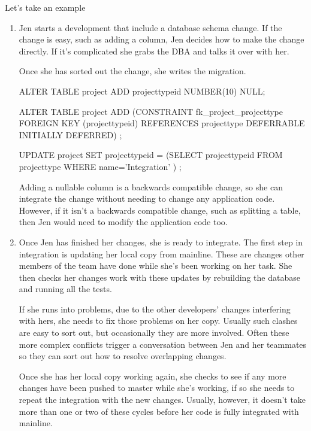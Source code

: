 \documentclass[12pt]{article}
\begin{document}
Let's take an example

\begin{enumerate}
  \item Jen starts a development that include a database schema change.
    If the change is easy, such as adding a column, Jen decides how to
    make the change directly. If it's complicated she grabs the DBA and
    talks it over with her.

    Once she has sorted out the change, she writes the migration.
    \begin{sqlcode}
ALTER TABLE project ADD projecttypeid NUMBER(10) NULL;

ALTER TABLE project ADD (CONSTRAINT fk_project_projecttype
  FOREIGN KEY (projecttypeid)
  REFERENCES projecttype DEFERRABLE INITIALLY DEFERRED)
;

UPDATE project
   SET projecttypeid = (SELECT projecttypeid
                          FROM projecttype
                         WHERE name='Integration'
                        )
;
    \end{sqlcode}

        Adding a nullable column is a backwards compatible change, so
        she can integrate the change without needing to change any
        application code. However, if it isn't a backwards compatible
        change, such as splitting a table, then Jen would need to modify
        the application code too.

      \item Once Jen has finished her changes, she is ready to
        integrate. The first step in integration is updating her local
        copy from mainline. These are changes other members of the team
        have done while she's been working on her task. She then checks
        her changes work with these updates by rebuilding the database
        and running all the tests.

        If she runs into problems, due to the other developers’ changes
        interfering with hers, she needs to fix those problems on her
        copy. Usually such clashes are easy to sort out, but
        occasionally they are more involved. Often these more complex
        conflicts trigger a conversation between Jen and her teammates
        so they can sort out how to resolve overlapping changes.

        Once she has her local copy working again, she checks to see if
        any more changes have been pushed to master while she's working,
        if so she needs to repeat the integration with the new changes.
        Usually, however, it doesn't take more than one or two of these
        cycles before her code is fully integrated with mainline.


\end{enumerate}
\end{document}
